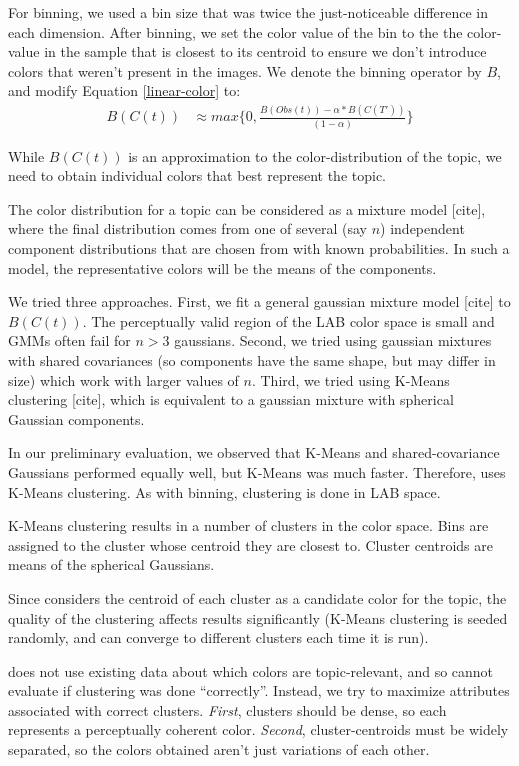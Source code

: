 For binning, we used a bin size that was twice the just-noticeable difference in each dimension. After binning, we set the color value of the bin to the the color-value in the sample that is closest to its centroid to ensure we don't introduce colors that weren't present in the images. We denote the binning operator by $B$, and modify Equation \ref{linear-color} to:
\begin{align}
\label{linear-color-bin}  
B(C(t)) &\approx max\{0,\frac{B(Obs(t)) - \alpha*B(C(T'))}{(1-\alpha)}\}
\end{align}

While $B(C(t))$ is an approximation to the color-distribution of the topic, we need to obtain individual colors that best represent the topic. 

The color distribution for a topic can be considered as a mixture model [cite], where the final distribution comes from one of several (say $n$) independent component distributions that are chosen from with known probabilities. In such a model, the representative colors will be the means of the components. 

We tried three approaches. First, we fit a general gaussian mixture model [cite] to $B(C(t))$. The perceptually valid region of the LAB color space is small and GMMs often fail for $n>3$ gaussians. Second, we tried using gaussian mixtures with shared covariances (so components have the same shape, but may differ in size) which work with larger values of $n$. Third, we tried using K-Means clustering [cite], which is equivalent to a gaussian mixture with spherical Gaussian components. 

In our preliminary evaluation, we observed that K-Means and shared-covariance Gaussians performed equally well, but K-Means was much faster. Therefore, \system uses K-Means clustering. As with binning, clustering is done in LAB space.

K-Means clustering results in a number of clusters in the color space. Bins are assigned to the cluster whose centroid they are closest to. Cluster centroids are means of the spherical Gaussians.

Since \system considers the centroid of each cluster as a candidate color for the topic, the quality of the clustering affects results significantly (K-Means clustering is seeded randomly, and can converge to different clusters each time it is run).

\system does not use existing data about which colors are topic-relevant, and so cannot evaluate if clustering was done ``correctly''. Instead, we try to maximize attributes associated with correct clusters. {\em First}, clusters should be dense, so each represents a perceptually coherent color. {\em Second}, cluster-centroids must be widely separated, so the colors obtained aren't just variations of each other. 

